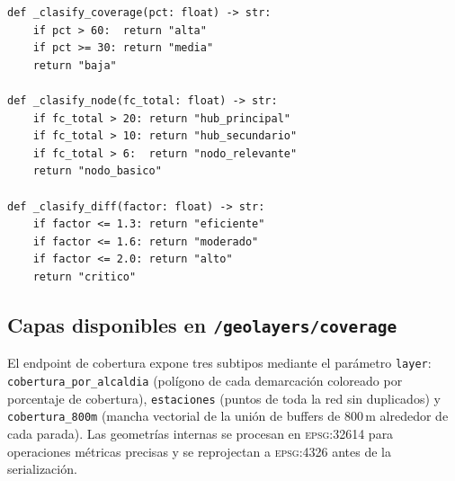 \begin{lstlisting}[style=estiloPython,
    caption={Clasificadores cualitativos para cobertura, fuerza capilar y
             factor de desviación. \texttt{src/api/routes/geo\_layers.py}.},
    label=lst:vft-clasifiers]
def _clasify_coverage(pct: float) -> str:
    if pct > 60:  return "alta"
    if pct >= 30: return "media"
    return "baja"

def _clasify_node(fc_total: float) -> str:
    if fc_total > 20: return "hub_principal"
    if fc_total > 10: return "hub_secundario"
    if fc_total > 6:  return "nodo_relevante"
    return "nodo_basico"

def _clasify_diff(factor: float) -> str:
    if factor <= 1.3: return "eficiente"
    if factor <= 1.6: return "moderado"
    if factor <= 2.0: return "alto"
    return "critico"
\end{lstlisting}

\subsection*{Capas disponibles en \texttt{/geolayers/coverage}}

El endpoint de cobertura expone tres subtipos mediante el parámetro
\texttt{layer}: \texttt{cobertura\_por\_alcaldia} (polígono de cada demarcación
coloreado por porcentaje de cobertura), \texttt{estaciones} (puntos de toda la
red sin duplicados) y \texttt{cobertura\_800m} (mancha vectorial de la unión de
buffers de 800\,m alrededor de cada parada). Las geometrías internas se procesan
en \textsc{epsg:32614} para operaciones métricas precisas y se reprojectan a
\textsc{epsg:4326} antes de la serialización.
